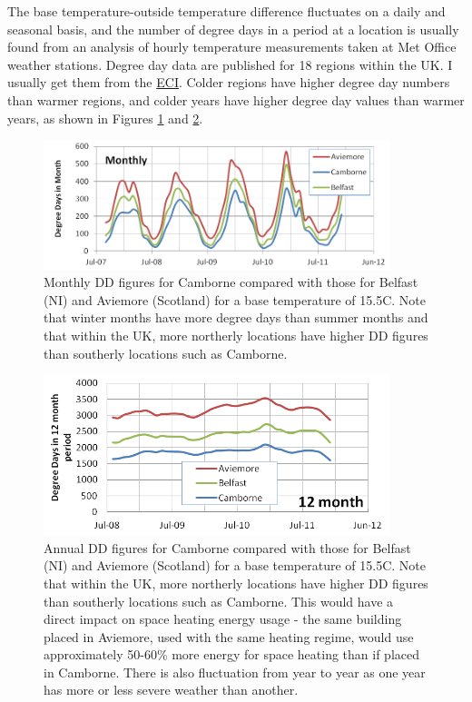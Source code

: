 \documentclass{article}
\begin{document}
The base temperature-outside temperature difference fluctuates on a daily and seasonal basis, and the number of degree days in a period at a location is usually found from an analysis of hourly temperature measurements taken at Met Office weather stations. Degree day data are published for 18 regions within the UK. I usually get them from the \href{http://www.eci.ox.ac.uk/research/energy/degreedays.php}{ECI}. Colder regions have higher degree day numbers than warmer regions, and colder years have higher degree day values than warmer years, as shown in Figures \ref{fig:DD_by_month} and \ref{fig:DD_by_place}.

\begin{figure}[ht]
\includegraphics[width=0.9\textwidth]{DD_by_month_to_12_2011}
\caption{Monthly DD figures for Camborne compared with those for Belfast (NI) and Aviemore (Scotland) for a base temperature of 15.5\degree C. Note that winter months have more degree days than summer months and that within the UK, more northerly locations have higher DD figures than southerly locations such as Camborne.}
\label{fig:DD_by_month}
\end{figure}

\begin{figure}[ht]
\includegraphics[width=0.9\textwidth]{DD_by_Place_to_12_2011}
\caption{Annual DD figures for Camborne compared with those for Belfast (NI) and Aviemore (Scotland) for a base temperature of 15.5\degree C. Note that  within the UK, more northerly locations have higher DD figures than southerly locations such as Camborne. This would have a direct impact on space heating energy usage - the same building placed in Aviemore, used with the same heating regime, would use approximately 50-60\% more energy for space heating than if placed in Camborne. There is also fluctuation from year to year as one year has more or less severe weather than another.}
\label{fig:DD_by_place}
\end{figure}
\end{document}
